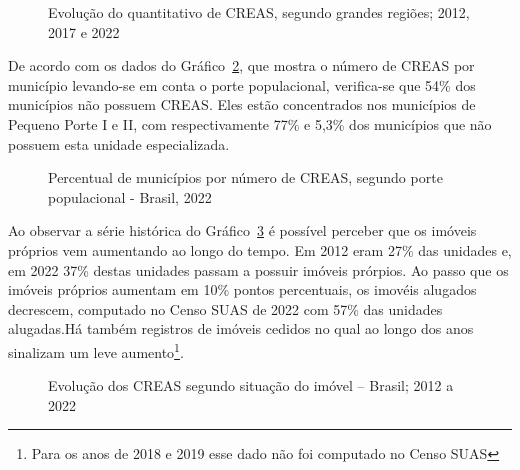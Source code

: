 \documentclass[
  letterpaper,
  DIV=11,
  numbers=noendperiod]{scrreprt}
\begin{document}
\begin{figure}


\caption{\label{fig-creas-quantitativo}Evolução do quantitativo de
CREAS, segundo grandes regiões; 2012, 2017 e 2022}

\end{figure}%

De acordo com os dados do Gráfico~\ref{fig-CREAS-porte}, que mostra o
número de CREAS por município levando-se em conta o porte populacional,
verifica-se que 54\% dos municípios não possuem CREAS. Eles estão
concentrados nos municípios de Pequeno Porte I e II, com respectivamente
77\% e 5,3\% dos municípios que não possuem esta unidade especializada.

\begin{figure}


\caption{\label{fig-CREAS-porte}Percentual de municípios por número de
CREAS, segundo porte populacional - Brasil, 2022}

\end{figure}%

Ao observar a série histórica do Gráfico~\ref{fig-creas-situacao} é
possível perceber que os imóveis próprios vem aumentando ao longo do
tempo. Em 2012 eram 27\% das unidades e, em 2022 37\% destas unidades
passam a possuir imóveis prórpios. Ao passo que os imóveis próprios
aumentam em 10\% pontos percentuais, os imovéis alugados decrescem,
computado no Censo SUAS de 2022 com 57\% das unidades alugadas.Há também
registros de imóveis cedidos no qual ao longo dos anos sinalizam um leve
aumento\footnote{Para os anos de 2018 e 2019 esse dado não foi computado
  no Censo SUAS}.

\begin{figure}


\caption{\label{fig-creas-situacao}Evolução dos CREAS segundo situação
do imóvel -- Brasil; 2012 a 2022}

\end{figure}%
\end{document}
